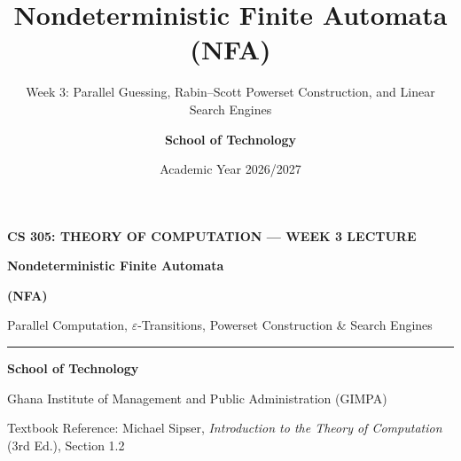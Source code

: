 \documentclass[aspectratio=169, 10pt]{beamer}
\title{\textbf{\LARGE Nondeterministic Finite Automata (NFA)}}
\subtitle{\vspace{0.12cm}\large Week 3: Parallel Guessing, Rabin--Scott Powerset Construction, and Linear Search Engines}
\author{\textbf{School of Technology}}
\institute{Ghana Institute of Management and Public Administration (GIMPA)}
\date{Academic Year 2026/2027}
\begin{document}
\begin{frame}[plain]
  \begin{center}
    \vspace{0.4cm}
    {\scriptsize\bfseries\color{gimpaaccent}CS 305: THEORY OF COMPUTATION --- WEEK 3 LECTURE}\par
    \vspace{0.25cm}
    {\LARGE\bfseries\color{gimpanavy}Nondeterministic Finite Automata}\par
    \vspace{0.06cm}
    {\LARGE\bfseries\color{gimpanavy}(NFA)}\par
    \vspace{0.25cm}
    {\normalsize\color{gimpaslate}Parallel Computation, $\varepsilon$-Transitions, Powerset Construction \& Search Engines}\par
    \vspace{0.4cm}
    {\color{ruleGray}\rule{0.6\textwidth}{0.8pt}}\par
    \vspace{0.35cm}
    {\footnotesize\bfseries\color{gimpanavy}School of Technology}\par
    \vspace{0.05cm}
    {\scriptsize\color{gimpaslate}Ghana Institute of Management and Public Administration (GIMPA)}\par
    \vspace{0.35cm}
    {\tiny\color{gimpaslate}Textbook Reference: Michael Sipser, \textit{Introduction to the Theory of Computation} (3rd Ed.), Section 1.2}
  \end{center}
\end{frame}
\end{document}

